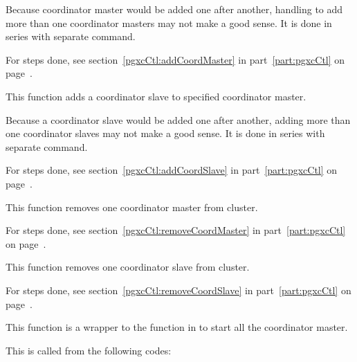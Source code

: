       Because coordinator master would be added one after another, handling to add more than
	  one coordinator masters may not make a good sense.
      It is done in series with separate  command.
      
      For steps done, see section~\ref{pgxcCtl:addCoordMaster} in part~\ref{part:pgxcCtl} on
	  page~\pageref{pgxcCtl:addCoordMaster}.
  
  
      This function adds a coordinator slave to specified coordinator master.
      
      Because a coordinator slave would be added one after another, adding more than
	  one coordinator slaves may not make a good sense.
      It is done in series with separate  command.
      
      For steps done, see section~\ref{pgxcCtl:addCoordSlave} in part~\ref{part:pgxcCtl} on
	  page~\pageref{pgxcCtl:addCoordSlave}.
  
  
      This function removes one coordinator master from \XC{} cluster.
      
      For steps done, see section~\ref{pgxcCtl:removeCoordMaster} in part~\ref{part:pgxcCtl} on
	  page~\pageref{pgxcCtl:removeCoordMaster}.
  
  
      This function removes one coordinator slave from \XC{} cluster.
      
      For steps done, see section~\ref{pgxcCtl:removeCoordSlave} in part~\ref{part:pgxcCtl} on
	  page~\pageref{pgxcCtl:removeCoordSlave}.
  
  
      This function is a wrapper to the function  in
	   to start all the coordinator master.
      
      This is called from the following codes:
      
      \FuncRefHdr
		  \\ \vspace{3pt}
		  \\ \vspace{3pt}
		  \\ \hline
      \FuncRefTrailor
  
